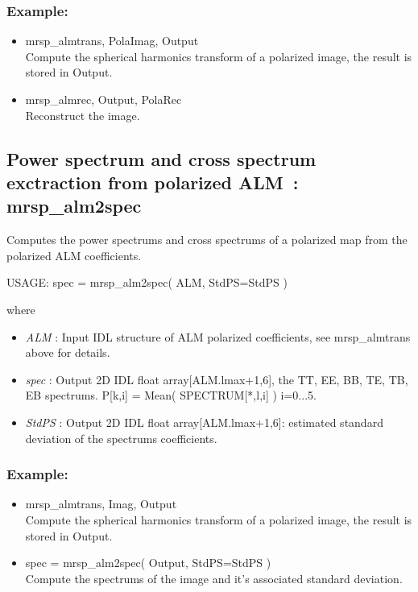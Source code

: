 \subsubsection*{Example:} 
\begin{itemize}
\item mrsp\_almtrans, PolaImag, Output \\
Compute the spherical harmonics transform of a polarized image, the result is stored in Output.
\item mrsp\_almrec, Output, PolaRec \\
Reconstruct the image.
\end{itemize}



\subsection{Power spectrum and cross spectrum exctraction from polarized ALM~: mrsp\_alm2spec}
Computes the power spectrums and cross spectrums of a polarized map from the polarized ALM coefficients.
{\bf
\begin{center}
     USAGE: spec = mrsp\_alm2spec( ALM, StdPS=StdPS )
\end{center}}
where
\begin{itemize}
\item {\em ALM} : Input IDL structure of ALM polarized coefficients, see mrsp\_almtrans above for details.
\item {\em spec} : Output 2D IDL float array[ALM.lmax+1,6], the TT, EE, BB, TE, TB, EB spectrums. P[k,i] = Mean( SPECTRUM[*,l,i] ) \quad i=0...5.
\item {\em StdPS} : Output 2D IDL float array[ALM.lmax+1,6]: estimated standard deviation of the spectrums coefficients.
\end{itemize}

\subsubsection*{Example:} 
\begin{itemize}
\item mrsp\_almtrans, Imag, Output \\
Compute the spherical harmonics transform of a polarized image, the result is stored in Output.
\item spec = mrsp\_alm2spec( Output, StdPS=StdPS ) \\
Compute the spectrums of the image and it's associated standard deviation.
\end{itemize}



